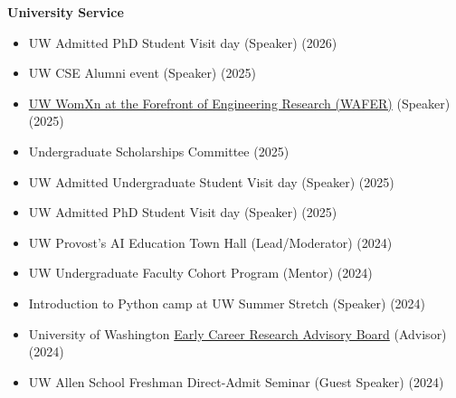 \documentclass[paper=letter,fontsize=11pt]{scrartcl} %
\begin{document}
\noindent \textbf{University Service}
\begin{itemize}
    \item UW Admitted PhD Student Visit day (Speaker) (2026)
    \item UW CSE Alumni event (Speaker) (2025)
    \item \href{https://www.ece.uw.edu/news-events/wafer/}{UW WomXn at the Forefront of Engineering Research (WAFER)} (Speaker) (2025)
    \item Undergraduate Scholarships Committee (2025)
    \item UW Admitted Undergraduate Student Visit day (Speaker) (2025)
    \item UW Admitted PhD Student Visit day (Speaker) (2025)
    \item UW Provost's AI Education Town Hall (Lead/Moderator) (2024)
    \item UW Undergraduate Faculty Cohort Program (Mentor) (2024)
    \item Introduction to Python camp at UW Summer Stretch (Speaker) (2024)
    \item University of Washington \href{https://www.washington.edu/research/or/advisory-boards/early-career-research-advisory-group/}{Early Career Research Advisory Board} (Advisor)  (2024)
    \item UW Allen School Freshman Direct-Admit Seminar (Guest Speaker) (2024)
\end{itemize}
\end{document}
